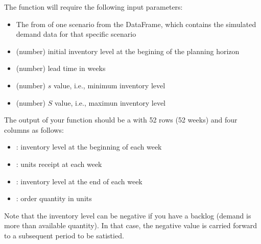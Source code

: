 \documentclass[letterpaper,10pt,english]{jupyterBook}
\begin{document}
\sphinxAtStartPar
The function will require the following input parameters:
\begin{itemize}
\item {} 
\sphinxAtStartPar
The  from of one scenario from the DataFrame, which contains the simulated demand data for that specific scenario

\item {} 
\sphinxAtStartPar
(number) initial inventory level at the begining of the planning horizon

\item {} 
\sphinxAtStartPar
(number) lead time in weeks

\item {} 
\sphinxAtStartPar
(number) \(s\) value, i.e., minimum inventory level

\item {} 
\sphinxAtStartPar
(number) \(S\) value, i.e., maximun inventory level

\end{itemize}

\sphinxAtStartPar
The output of your function should be a  with 52 rows (52 weeks) and  four columns as follows:
\begin{itemize}
\item {} 
\sphinxAtStartPar
{}: inventory level at the beginning of each week

\item {} 
\sphinxAtStartPar
{}: units receipt at each week

\item {} 
\sphinxAtStartPar
{}: inventory level at the end of each week

\item {} 
\sphinxAtStartPar
{}: order quantity in units

\end{itemize}

\sphinxAtStartPar
Note that the inventory level can be negative if you have a backlog (demand is more than available quantity). In that case, the negative value is carried forward to a subsequent period to be satistied.
\end{document}
